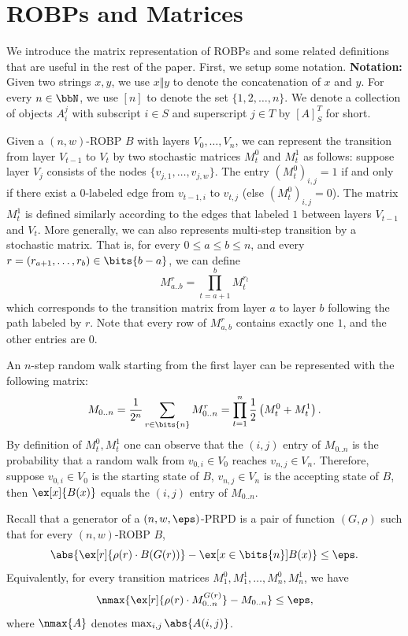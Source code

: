 \section{ROBPs and Matrices}\label{sec:matrices}
We introduce the matrix representation of ROBPs and some related definitions that are useful in the rest of the paper. First, we setup some notation.
\newline
\textbf{Notation:} Given two strings $x,y$, we use $x\Vert y$ to denote the concatenation of $x$ and $y$. For every $n\in\bbN$, we use $[n]$ to denote the set $\{1,2,\dots,n\}$. We denote a collection of objects $A_i^j$ with subscript $i\in S$ and superscript $j\in T$ by $[A]_S^T$ for short.

Given a $(n,w)$-ROBP $B$ with layers $V_0,\dots,V_n$, we can represent the transition from layer $V_{t-1}$ to $V_{t}$ by two stochastic matrices $M_t^0$ and $M_t^1$ as follows: suppose layer $V_j$ consists of the nodes $\{v_{j,1},\dots,v_{j,w}\}$.  The entry $(M_t^0)_{i,j}=1$ if and only if there exist a $0$-labeled edge from $v_{t-1,i}$ to $v_{t,j}$ (else $(M_t^0)_{i,j}=0$). The matrix $M_t^1$ is defined similarly according to the edges that labeled $1$ between layers $V_{t-1}$ and $V_t$. More generally, we can also represents multi-step transition by a stochastic matrix. That is, for every $0\le a\le b\le n$, and every $r=(r_{a+1},\ldots,r_b)\in\bits{b-a}$, we can define
$$M_{a..b}^r=\prod_{t=a+1}^b M_t^{r_t}$$
which corresponds to the transition matrix from layer $a$ to layer $b$ following the path labeled by $r$. Note that every row of $M_{a,b}^r$ contains exactly one $1$, and the other entries are $0$.

An $n$-step random walk starting from the first layer can be represented with the following matrix:
$$M_{0..n}=\frac{1}{2^n}\sum_{r\in\bits{n}}M_{0..n}^r=\prod_{t=1}^n \frac{1}{2}\left(M_t^0+M_t^1\right).$$
By definition of $M_t^0,M_t^1$ one can observe that the $(i,j)$ entry of $M_{0..n}$ is the probability that a random walk from $v_{0,i}\in V_0$  reaches $v_{n,j}\in V_n$. Therefore, suppose $v_{0,i}\in V_0$ is the starting state of $B$, $v_{n,j}\in V_n$ is the accepting state of $B$, then $\ex[x]{B(x)}$ equals the $(i,j)$ entry of $M_{0..n}$. 

Recall that a generator of a $(n,w,\eps)$-PRPD is a pair of function $(G,\rho)$ such that for every $(n,w)$-ROBP $B$,
$$\abs{\ex[r]{\rho(r)\cdot B(G(r))}-\ex[x\in\bits{n}]{B(x)}}\le \eps.$$
Equivalently, for every transition matrices $M_1^0,M_1^1,\ldots,M_n^0,M_n^1$, we have 
$$\nmax{\ex[r]{\rho(r)\cdot M_{0..n}^{G(r)}} - M_{0..n}}\le \eps,$$
where $\nmax{A}$ denotes $\max_{i,j}\abs{A(i,j)}$. 

